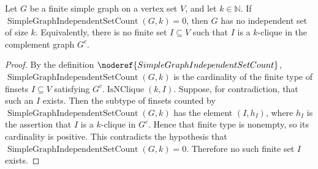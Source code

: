 \begin{helper}
Let \(G\) be a finite simple graph on a vertex set \(V\), and let \(k\in\mathbb N\).
If \(\operatorname{SimpleGraphIndependentSetCount}(G,k)=0\), then \(G\) has no
independent set of size \(k\).  Equivalently, there is no finite set
\(I\subseteq V\) such that \(I\) is a \(k\)-clique in the complement graph
\(G^c\).
\end{helper}
\begin{proof}
By the definition \(\noderef{SimpleGraphIndependentSetCount}\),
\(\operatorname{SimpleGraphIndependentSetCount}(G,k)\) is the cardinality of
the finite type of finsets \(I\subseteq V\) satisfying \(G^c.\operatorname{IsNClique}(k,I)\).
Suppose, for contradiction, that such an \(I\) exists.  Then the subtype of
finsets counted by \(\operatorname{SimpleGraphIndependentSetCount}(G,k)\) has
the element \((I,h_I)\), where \(h_I\) is the assertion that \(I\) is a
\(k\)-clique in \(G^c\).  Hence that finite type is nonempty, so its cardinality
is positive.  This contradicts the hypothesis that
\(\operatorname{SimpleGraphIndependentSetCount}(G,k)=0\).  Therefore no such
finite set \(I\) exists.
\end{proof}
